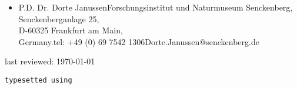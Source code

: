 \documentclass[letter,10pt]{article}
\begin{document}
\begin{small}
\begin{itemize}
		\item{P.D. Dr. Dorte Janussen\newline Forschungsinstitut und Naturmuseum Senckenberg,\\ Senckenberganlage 25,\\ D-60325 Frankfurt am Main,\\Germany.\newline tel: +49 (0) 69 7542 1306\newline Dorte.Janussen@senckenberg.de}
	\end{itemize}

	\begin{flushright}
		last reviewed: \today
	\end{flushright}
\end{small}

\begin{center}
	{\scriptsize \texttt{typesetted using}}\\{\small \texttt{\LaTeXe}}\pagebreak
\end{center}
\end{document}
